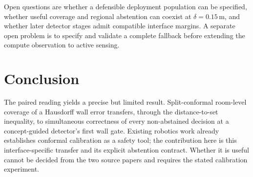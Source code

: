 \documentclass{article}
\begin{document}
Open questions are whether a defensible deployment population can be specified, whether useful coverage and regional abstention can coexist at $\delta=0.15\,\mathrm{m}$, and whether later detector stages admit compatible interface margins. A separate open problem is to specify and validate a complete fallback before extending the compute observation to active sensing.

\section{Conclusion}

The paired reading yields a precise but limited result. Split-conformal room-level coverage of a Hausdorff wall error transfers, through the distance-to-set inequality, to simultaneous correctness of every non-abstained decision at a concept-guided detector's first wall gate. Existing robotics work already establishes conformal calibration as a safety tool; the contribution here is this interface-specific transfer and its explicit abstention contract. Whether it is useful cannot be decided from the two source papers and requires the stated calibration experiment.



\end{document}
